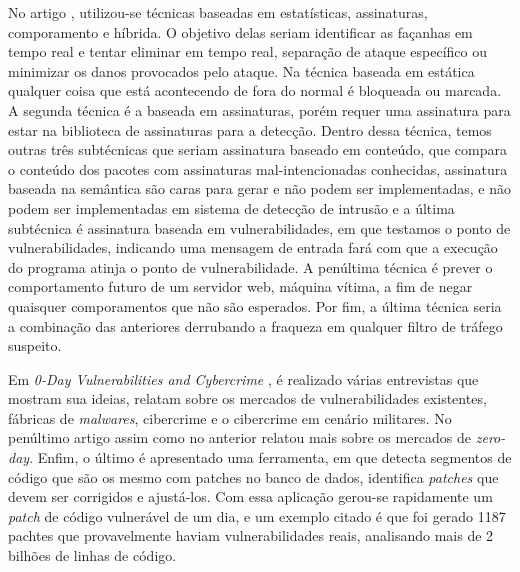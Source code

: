 No artigo \cite{Kumar:2016}, utilizou-se técnicas baseadas em estatísticas, assinaturas, comporamento e híbrida. O objetivo delas seriam 
identificar as façanhas em tempo real e tentar eliminar em tempo real, separação de ataque específico ou minimizar os danos provocados 
pelo ataque. Na técnica baseada em estática qualquer coisa que está acontecendo de fora do normal é bloqueada ou marcada. A segunda 
técnica é a baseada em assinaturas, porém requer uma assinatura para estar na biblioteca de assinaturas para a detecção. Dentro dessa 
técnica, temos outras três subtécnicas que seriam assinatura baseado em conteúdo, que compara o conteúdo dos pacotes com assinaturas
mal-intencionadas conhecidas, assinatura baseada na semântica são caras para gerar e não podem ser implementadas, e não podem ser 
implementadas em sistema de detecção de intrusão e a última subtécnica é assinatura baseada em vulnerabilidades, em que testamos o ponto 
de vulnerabilidades, indicando uma mensagem de entrada fará com que a execução do programa atinja o ponto de vulnerabilidade. A penúltima 
técnica é prever o comportamento futuro de um servidor web, máquina vítima, a fim de negar quaisquer comporamentos que não são esperados. 
Por fim, a última técnica seria a combinação das anteriores derrubando a fraqueza em qualquer filtro de tráfego suspeito.

Em \textit{0-Day Vulnerabilities and Cybercrime} \cite{Fotiet:2015}, é realizado várias entrevistas que mostram sua ideias, relatam sobre 
os mercados de vulnerabilidades existentes, fábricas de \textit{malwares}, cibercrime e o cibercrime em cenário militares. No penúltimo 
artigo \cite{Egelman:2013} assim como no anterior relatou mais sobre os mercados de \textit{zero-day}. Enfim, o último \cite{Luo:2015} é 
apresentado uma ferramenta, em que detecta segmentos de código que são os mesmo com patches no banco de dados, identifica \textit{patches}
que devem ser corrigidos e ajustá-los. Com essa aplicação gerou-se rapidamente um \textit{patch} de código vulnerável de um dia, e um 
exemplo citado é que foi gerado 1187 pachtes que provavelmente haviam vulnerabilidades reais, analisando mais de 2 bilhões de linhas de 
código.
